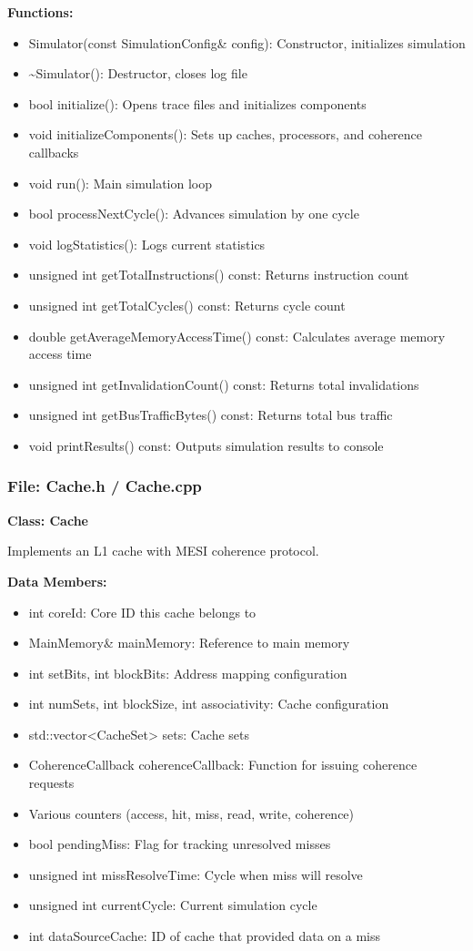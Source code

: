 \documentclass[12pt,a4paper]{article}
\begin{document}
\textbf{Functions:}
\begin{itemize}
    \item Simulator(const SimulationConfig\& config): Constructor, initializes simulation
    \item \~{}Simulator(): Destructor, closes log file
    \item bool initialize(): Opens trace files and initializes components
    \item void initializeComponents(): Sets up caches, processors, and coherence callbacks
    \item void run(): Main simulation loop
    \item bool processNextCycle(): Advances simulation by one cycle
    \item void logStatistics(): Logs current statistics
    \item unsigned int getTotalInstructions() const: Returns instruction count
    \item unsigned int getTotalCycles() const: Returns cycle count
    \item double getAverageMemoryAccessTime() const: Calculates average memory access time
    \item unsigned int getInvalidationCount() const: Returns total invalidations
    \item unsigned int getBusTrafficBytes() const: Returns total bus traffic
    \item void printResults() const: Outputs simulation results to console
\end{itemize}

\subsubsection*{File: Cache.h / Cache.cpp}

\textbf{Class: Cache}

Implements an L1 cache with MESI coherence protocol.

\textbf{Data Members:}
\begin{itemize}
    \item int coreId: Core ID this cache belongs to
    \item MainMemory\& mainMemory: Reference to main memory
    \item int setBits, int blockBits: Address mapping configuration
    \item int numSets, int blockSize, int associativity: Cache configuration
    \item std::vector<CacheSet> sets: Cache sets
    \item CoherenceCallback coherenceCallback: Function for issuing coherence requests
    \item Various counters (access, hit, miss, read, write, coherence)
    \item bool pendingMiss: Flag for tracking unresolved misses
    \item unsigned int missResolveTime: Cycle when miss will resolve
    \item unsigned int currentCycle: Current simulation cycle
    \item int dataSourceCache: ID of cache that provided data on a miss
\end{itemize}
\end{document}
